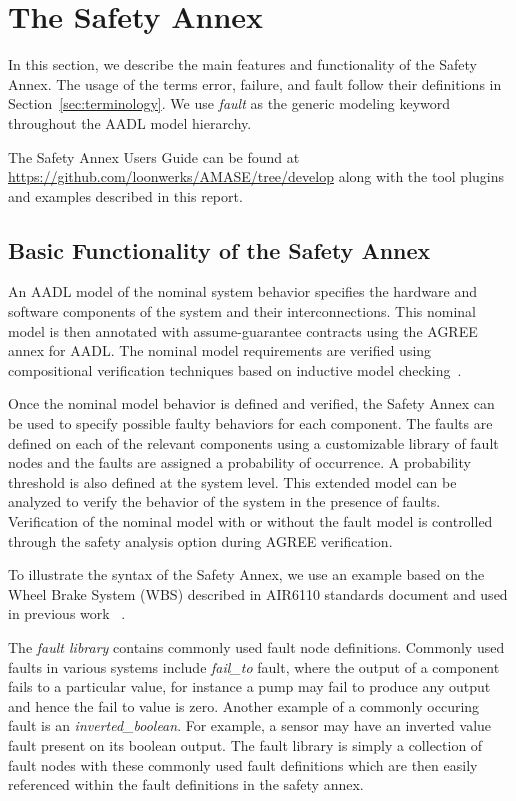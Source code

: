 \section{The Safety Annex}
\label{sec:safety_annex}

In this section, we describe the main features and functionality of the Safety Annex. The usage of the terms error, failure, and fault follow their definitions in Section~\ref{sec:terminology}. We use {\em fault} as the generic modeling keyword throughout the AADL model hierarchy.

The Safety Annex Users Guide can be found at \url{https://github.com/loonwerks/AMASE/tree/develop} along with the tool plugins and examples described in this report. 




\subsection{Basic Functionality of the Safety Annex}

An AADL model of the nominal system behavior specifies the hardware and software components of the system and their interconnections. This nominal model is then annotated with assume-guarantee contracts using the AGREE annex for AADL. The nominal model requirements are verified using compositional verification techniques based on inductive model checking~\cite{2017arXiv171201222G}.

Once the nominal model behavior is defined and verified, the Safety Annex can be used to specify possible faulty behaviors for each component. The faults are defined on each of the relevant components using a customizable library of fault nodes and the faults are assigned a probability of occurrence. A probability threshold is also defined at the system level. This extended model can be analyzed to verify the behavior of the system in the presence of faults. Verification of the nominal model with or without the fault model is controlled through the safety analysis option during AGREE verification.

To illustrate the syntax of the Safety Annex, we use an example based on the Wheel Brake System (WBS) described in AIR6110 standards document and used in  previous work ~\cite{Stewart17:IMBSA, AIR6110}.

The \textit{fault library} contains commonly used fault node definitions. Commonly used faults in various systems include \textit{fail\_to} fault, where the output of a component fails to a particular value, for instance a pump may fail to produce any output and hence the fail to value is zero. Another example of a commonly occuring fault is an \textit{inverted\_boolean}. For example, a sensor may have an inverted value fault present on its boolean output. The fault library is simply a collection of fault nodes with these commonly used fault definitions which are then easily referenced within the fault definitions in the safety annex. 


